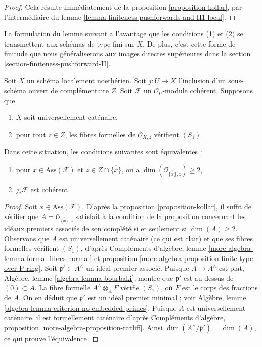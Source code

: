 \begin{proof}
Cela résulte immédiatement de la proposition \ref{proposition-kollar}, par l'intermédiaire du lemme \ref{lemma-finiteness-pushforwards-and-H1-local}.
\end{proof}

\noindent
La formulation du lemme suivant a l'avantage que les conditions (1) et (2) se transmettent aux schémas de type fini sur $X$. De plus, c'est cette forme de finitude que nous généraliserons aux images directes supérieures dans la section \ref{section-finiteness-pushforward-II}.

\begin{lemma}
\label{lemma-finiteness-pushforward-general}
Soit $X$ un schéma localement noethérien. Soit $j : U \to X$ l'inclusion d'un sous-schéma ouvert de complémentaire $Z$. Soit $\mathcal{F}$ un $\mathcal{O}_U$-module cohérent. Supposons que
\begin{enumerate}
\item $X$ soit universellement caténaire,
\item pour tout $z \in Z$, les fibres formelles de $\mathcal{O}_{X, z}$ vérifient $(S_1)$.
\end{enumerate}
Dans cette situation, les conditions suivantes sont équivalentes :
\begin{enumerate}
\item[(a)] pour $x \in \text{Ass}(\mathcal{F})$ et $z \in Z \cap \overline{\{x\}}$, on a $\dim(\mathcal{O}_{\overline{\{x\}}, z}) \geq 2$,
\item[(b)] $j_*\mathcal{F}$ est cohérent.
\end{enumerate}
\end{lemma}

\begin{proof}
Soit $x \in \text{Ass}(\mathcal{F})$. D'après la proposition \ref{proposition-kollar}, il suffit de vérifier que $A = \mathcal{O}_{\overline{\{x\}}, z}$ satisfait à la condition de la proposition concernant les idéaux premiers associés de son complété si et seulement si $\dim(A) \geq 2$. Observons que $A$ est universellement caténaire (ce qui est clair) et que ses fibres formelles vérifient $(S_1)$, d'après Compléments d'algèbre, lemme \ref{more-algebra-lemma-formal-fibres-normal} et proposition \ref{more-algebra-proposition-finite-type-over-P-ring}. Soit $\mathfrak p' \subset A^\wedge$ un idéal premier associé. Puisque $A \to A^\wedge$ est plat, Algèbre, lemme \ref{algebra-lemma-bourbaki}, montre que $\mathfrak p'$ est au-dessus de $(0) \subset A$. La fibre formelle $A^\wedge \otimes_A F$ vérifie $(S_1)$, où $F$ est le corps des fractions de $A$. On en déduit que $\mathfrak p'$ est un idéal premier minimal ; voir Algèbre, lemme \ref{algebra-lemma-criterion-no-embedded-primes}. Puisque $A$ est universellement caténaire, il est formellement caténaire d'après Compléments d'algèbre, proposition \ref{more-algebra-proposition-ratliff}. Ainsi $\dim(A^\wedge/\mathfrak p') = \dim(A)$, ce qui prouve l'équivalence.
\end{proof}






